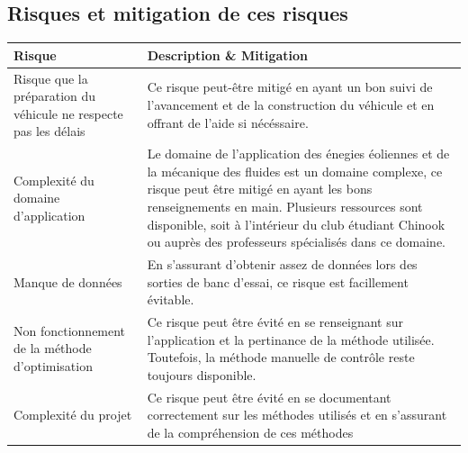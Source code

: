 \documentclass[11pt]{article}
\begin{document}
\subsection{Risques et mitigation de ces risques}

\begin{table}[H]
  \begin{center}
\begin{tabu} to \linewidth {X[1.5,l]|X[3,l]}
  Risque & Description \& Mitigation \\ \hline
  Risque que la préparation du véhicule ne respecte pas les délais & Ce risque peut-être mitigé en ayant un bon suivi de l'avancement et de la construction du véhicule et en offrant de l'aide si nécéssaire. \\ \hline
  Complexité du domaine d'application & Le domaine de l'application des énegies éoliennes et de la mécanique des fluides est un domaine complexe, ce risque peut être mitigé en ayant les bons renseignements en main. Plusieurs ressources sont disponible, soit à l'intérieur du club étudiant Chinook ou auprès des professeurs spécialisés dans ce domaine.\\ \hline
  Manque de données & En s'assurant d'obtenir assez de données lors des sorties de banc d'essai, ce risque est facillement évitable.\\ \hline
  Non fonctionnement de la méthode d'optimisation & Ce risque peut être évité en se renseignant sur l'application et la pertinance de la méthode utilisée. Toutefois, la méthode manuelle de contrôle reste toujours disponible.\\ \hline
  Complexité du projet & Ce risque peut être évité en se documentant correctement sur les méthodes utilisés et en s'assurant de la compréhension de ces méthodes \\
\end{tabu}
  \end{center}
\end{table}
\end{document}
